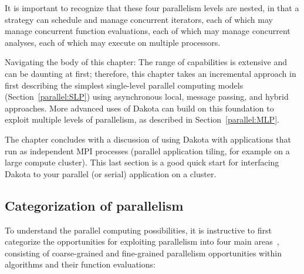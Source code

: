 It is important to recognize that these four parallelism levels are
nested, in that a strategy can schedule and manage concurrent
iterators, each of which may manage concurrent function evaluations,
each of which may manage concurrent analyses, each of which may
execute on multiple processors. 

Navigating the body of this chapter: The range of capabilities is
extensive and can be daunting at first; therefore, this chapter takes
an incremental approach in first describing the simplest single-level
parallel computing models (Section~\ref{parallel:SLP}) using
asynchronous local, message passing, and hybrid approaches.  More
advanced uses of Dakota can build on this foundation to exploit
multiple levels of parallelism, as described in
Section~\ref{parallel:MLP}.

The chapter concludes with a discussion of using Dakota with
applications that run as independent MPI processes (parallel
application tiling, for example on a large compute cluster).  This
last section is a good quick start for interfacing Dakota to your
parallel (or serial) application on a cluster.



\subsection{Categorization of parallelism}\label{parallel:overview:cat}

To understand the parallel computing possibilities, it is instructive
to first categorize the opportunities for exploiting parallelism into
four main areas~\cite{Eld98a}, consisting of coarse-grained and
fine-grained parallelism opportunities within algorithms and their
function evaluations:

